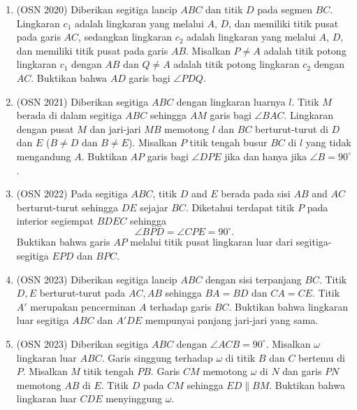 \documentclass[12pt,a4paper]{article}
\begin{document}
\begin{enumerate}
\item (OSN 2020) Diberikan segitiga lancip $ABC$ dan titik $D$ pada segmen $BC$. Lingkaran $c_1$ adalah lingkaran yang melalui $A$, $D$, dan memiliki titik pusat pada garis $AC$, sedangkan lingkaran $c_2$ adalah lingkaran yang melalui $A$, $D$, dan memiliki titik pusat pada garis $AB$. Misalkan $P \neq A$ adalah titik potong lingkaran $c_1$ dengan $AB$ dan $Q \neq A$ adalah titik potong lingkaran $c_2$ dengan $AC$. Buktikan bahwa $AD$ garis bagi $\angle PDQ$.

\item (OSN 2021) Diberikan segitiga $ABC$ dengan lingkaran luarnya $l$. Titik $M$ berada di dalam segitiga $ABC$ sehingga $AM$ garis bagi $\angle BAC$. Lingkaran dengan pusat $M$ dan jari-jari $MB$ memotong $l$ dan $BC$ berturut-turut di $D$ dan $E$ ($B \neq D$ dan $B \neq E$). Misalkan $P$ titik tengah busur $BC$ di $l$ yang tidak mengandung $A$. Buktikan $AP$ garis bagi $\angle DPE$ jika dan hanya jika $\angle B = 90^\circ$.

\item (OSN 2022) Pada segitiga $ABC$, titik $D$ and $E$ berada pada sisi $AB$ and $AC$ berturut-turut sehingga $DE$ sejajar $BC$. Diketahui terdapat titik $P$ pada interior segiempat $BDEC$ sehingga
$$\angle BPD = \angle CPE = 90^\circ.$$
Buktikan bahwa garis $AP$ melalui titik pusat lingkaran luar dari segitiga-segitiga $EPD$ dan $BPC$.

\item (OSN 2023) Diberikan segitiga lancip $ABC$ dengan sisi terpanjang $BC$. Titik $D, E$ berturut-turut pada $AC, AB$ sehingga $BA = BD$ dan $CA = CE$. Titik $A'$ merupakan pencerminan $A$ terhadap garis $BC$. Buktikan bahwa lingkaran luar segitiga $ABC$ dan $A'DE$ mempunyai panjang jari-jari yang sama.

\item (OSN 2023) Diberikan segitiga $ABC$ dengan $\angle ACB = 90^\circ$. Misalkan $\omega$ lingkaran luar $ABC$. Garis singgung terhadap $\omega$ di titik $B$ dan $C$ bertemu di $P$. Misalkan $M$ titik tengah $P B$. Garis $CM$ memotong $\omega$ di $N$ dan garis $P N$ memotong $AB$ di $E$. Titik $D$ pada $CM$ sehingga $ED \parallel BM$. Buktikan bahwa lingkaran luar $CDE$ menyinggung $\omega$.


\end{enumerate}
\end{document}
